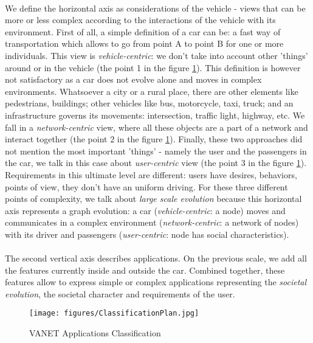 \documentclass[a4paper]{article}
\begin{document}
\paragraph{}We define the horizontal axis as considerations of the vehicle - views that can be more or less complex according to the interactions of the vehicle with its environment. First of all, a simple definition of a car can be: a fast way of transportation which allows to go from point A to point B for one or more individuals. This view is \textit{vehicle-centric}: we don't take into account other 'things' around or in the vehicle (the point 1 in the figure \ref{ClassificationPlan}). This definition is however not satisfactory as a car does not evolve alone and moves in complex environments. Whatsoever a city or a rural place, there are other elements like pedestrians, buildings; other vehicles like bus, motorcycle, taxi, truck; and an infrastructure governs its movements: intersection, traffic light, highway, etc. We fall in a \textit{network-centric} view, where all these objects are a part of a network and interact together (the point 2 in the figure \ref{ClassificationPlan}). Finally, these two approaches did not mention the most important 'things' - namely the user and the passengers in the car, we talk in this case about \textit{user-centric} view (the point 3 in the figure \ref{ClassificationPlan}). Requirements in this ultimate level are different: users have desires, behaviors, points of view, they don't have an uniform driving. For these three different points of complexity, we talk about \textit{large scale evolution} because this horizontal axis represents a graph evolution: a car (\textit{vehicle-centric}: a node) moves and communicates in a complex environment (\textit{network-centric}: a network of nodes) with its driver and passengers (\textit{user-centric}: node has social characteristics).

\paragraph{}The second vertical axis describes applications. On the previous scale, we add all the features currently inside and outside the car. Combined together, these features allow to express simple or complex applications representing the \textit{societal evolution}, the societal character and requirements of the user.\\ 
\begin{figure}[!htb]
\begin{center}
\texttt{[image: figures/ClassificationPlan.jpg]}
\caption{VANET Applications Classification}
\label{ClassificationPlan}
\end{center}
\end{figure}
\end{document}
